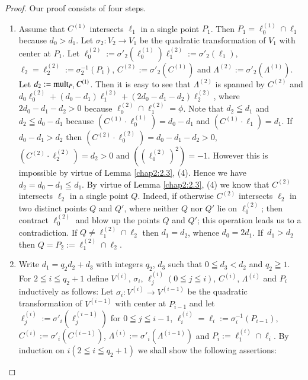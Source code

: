 \begin{proof}
Our proof consists of four steps.
\begin{enumerate}
\renewcommand{\theenumi}{\Roman{enumi}}
\renewcommand{\labelenumi}{\rm(\theenumi)}
\item Assume that $C^{(1)}$ intersects $\ell_{1}$ in a single point
  $P_{1}$. Then $P_{1}=\ell^{(1)}_{0}\cap \ell_{1}$ because
  $d_{0}>d_{1}$. Let $\sigma_{2}:V_{2}\to V_{1}$ be the quadratic
  transformation of $V_{1}$ with center at $P_{1}$. Let
  $\ell^{(2)}_{0}:=\sigma'_{2}(\ell^{(1)}_{0})\ell^{(2)}_{1}:=\sigma'_{2}(\ell_{1})$,
  $\ell_{2}=\ell^{(2)}_{2}:=\sigma^{-1}_{2}(P_{1})$,
  $C^{(2)}:=\sigma'_{2}(C^{(1)})$ and
  $\Lambda^{(2)}:=\sigma'_{2}(\Lambda^{(1)})$. Let
  $d_{2}:=\operatorname{mult}_{P_{1}}C^{(1)}$. Then it is easy to see that
  $\Lambda^{(2)}$ is spanned by $C^{(2)}$ and
  $d_{0}\ell_{0}^{(2)}+(d_{0}-d_{1})\ell^{(2)}_{1}+(2d_{0}-d_{1}-d_{2})\ell^{(2)}_{2}$,
  where $2d_{0}-d_{1}-d_{2}>0$ because
  $\ell^{(2)}_{0}\cap\ell^{(2)}_{1}=\phi$. Note that $d_{2}\leqq
  d_{1}$ and $d_{2}\leqq d_{0}-d_{1}$ because $(C^{(1)}\cdot
  \ell_{0}^{(1)})=d_{0}-d_{1}$ and $(C^{(1)}\cdot\ell_{1})=d_{1}$. If
  $d_{0}-d_{1}>d_{2}$ then
  $(C^{(2)}\cdot\ell^{(2)}_{0})=d_{0}-d_{1}-d_{2}>0$,
  $(C^{(2)}\cdot\ell^{(2)}_{2})=d_{2}>0$ and
  $((\ell^{(2)}_{0})^{2})=-1$. However this is impossible by virtue of
  Lemma \ref{chap2:2.3}, (4). Hence we have $d_{2}=d_{0}-d_{1}\leqq
  d_{1}$. By virtue of Lemma \ref{chap2:2.3}, (4) we know that $C^{(2)}$
  intersects $\ell_{2}$ in a single point $Q$. Indeed, if otherwise
  $C^{(2)}$ intersects $\ell_{2}$ in two distinct points $Q$ and $Q'$,
  where neither $Q$ nor $Q'$ lie on $\ell^{(2)}_{0}$; then contract
  $\ell^{(2)}_{0}$ and blow up the points $Q$ and $Q'$; this operation
  leads us to a contradiction. If $Q\neq \ell^{(2)}_{1}\cap \ell_{2}$
  then $d_{1}=d_{2}$, whence $d_{0}=2d_{1}$. If\pageoriginale\
  $d_{1}>d_{2}$ then $Q=P_{2}:=\ell^{(2)}_{1}\cap \ell_{2}$.

\item Write $d_{1}=q_{2}d_{2}+d_{3}$ with integers $q_{2}$, $d_{3}$
  such that $0\leqq d_{3}<d_{2}$ and $q_{2}\geqq 1$. For $2\leqq
  i\leqq q_{2}+1$ define $V^{(i)}$, $\sigma_{i}$,
  $\ell^{(i)}_{j}(0\leqq j\leqq i)$, $C^{(i)}$, $\Lambda^{(i)}$ and
  $P_{i}$ inductively as follows: Let $\sigma_{i}:V^{(i)}\to
  V^{(i-1)}$ be the quadratic transformation of $V^{(i-1)}$ with
  center at $P_{i-1}$ and let
  $\ell^{(i)}_{j}:=\sigma'_{i}(\ell^{(i-1)}_{j})$ for $0\leqq j\leqq
  i-1$, $\ell^{(i)}_{i}=\ell_{i}:=\sigma^{-1}_{i}(P_{i-1})$,
  $C^{(i)}:=\sigma'_{i}(C^{(i-1)})$,
  $\Lambda^{(i)}:=\sigma'_{i}(\Lambda^{(i-1)})$ and
  $P_{i}:=\ell^{(i)}_{1}\cap \ell_{i}$. By induction on $i(2\leqq
  i\leqq q_{2}+1)$ we shall show the following assertions:  


\end{enumerate}
\end{proof}
